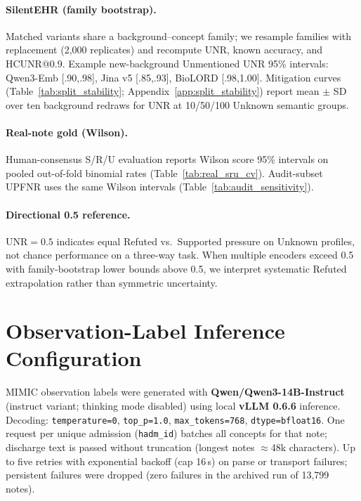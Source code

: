 \documentclass[11pt]{article}
\begin{document}
\paragraph{SilentEHR (family bootstrap).}
Matched variants share a background--concept family; we resample families with
replacement (2{,}000 replicates) and recompute UNR, known accuracy, and
HCUNR@0.9. Example new-background Unmentioned UNR 95\% intervals: Qwen3-Emb
[.90,.98], Jina v5 [.85,.93], BioLORD [.98,1.00]. Mitigation curves
(Table~\ref{tab:split_stability}; Appendix~\ref{app:split_stability}) report mean $\pm$ SD
over ten background redraws for UNR at 10/50/100 Unknown semantic groups.

\paragraph{Real-note gold (Wilson).}
Human-consensus S/R/U evaluation reports Wilson score 95\% intervals on pooled
out-of-fold binomial rates (Table~\ref{tab:real_sru_cv}). Audit-subset UPFNR
uses the same Wilson intervals (Table~\ref{tab:audit_sensitivity}).

\paragraph{Directional 0.5 reference.}
UNR$=0.5$ indicates equal Refuted vs.\ Supported pressure on Unknown profiles,
not chance performance on a three-way task. When multiple encoders exceed 0.5
with family-bootstrap lower bounds above 0.5, we interpret systematic Refuted
extrapolation rather than symmetric uncertainty.

\section{Observation-Label Inference Configuration}
\label{app:observation_labeling}

MIMIC observation labels were generated with \textbf{Qwen/Qwen3-14B-Instruct}
(instruct variant; thinking mode disabled) using local \textbf{vLLM 0.6.6}
inference. Decoding: \texttt{temperature=0}, \texttt{top\_p=1.0},
\texttt{max\_tokens=768}, \texttt{dtype=bfloat16}. One request per unique
admission (\texttt{hadm\_id}) batches all concepts for that note; discharge
text is passed without truncation (longest notes $\approx$48k characters).
Up to five retries with exponential backoff (cap 16\,s) on parse or transport
failures; persistent failures were dropped (zero failures in the archived run
of 13{,}799 notes).
\end{document}

